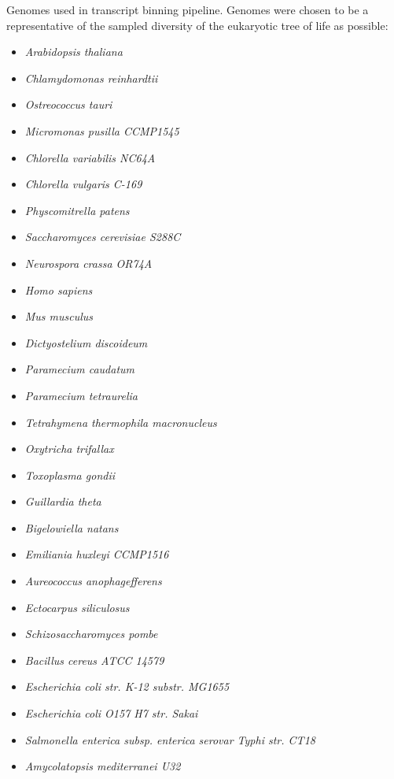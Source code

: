 Genomes used in transcript binning pipeline.
Genomes were chosen to be a representative of the sampled diversity of the 
eukaryotic tree of life as possible:
\begin{itemize}
    \item		\textit{Arabidopsis thaliana} 
    \item		\textit{Chlamydomonas reinhardtii} 
    \item		\textit{Ostreococcus tauri} 
    \item		\textit{Micromonas pusilla CCMP1545}   
    \item		\textit{Chlorella variabilis NC64A} 
    \item		\textit{Chlorella vulgaris C-169} 
    \item		\textit{Physcomitrella patens} 
    \item		\textit{Saccharomyces cerevisiae S288C}  
    \item		\textit{Neurospora crassa OR74A}
    \item		\textit{Homo sapiens}
    \item		\textit{Mus musculus}
    \item		\textit{Dictyostelium discoideum}
    \item		\textit{Paramecium caudatum}
    \item		\textit{Paramecium tetraurelia}
    \item		\textit{Tetrahymena thermophila macronucleus}
    \item		\textit{Oxytricha trifallax}
    \item		\textit{Toxoplasma gondii}
    \item		\textit{Guillardia theta}
    \item		\textit{Bigelowiella natans}
    \item		\textit{Emiliania huxleyi CCMP1516}
    \item		\textit{Aureococcus anophagefferens}
    \item		\textit{Ectocarpus siliculosus}
    \item		\textit{Schizosaccharomyces pombe}
    \item		\textit{Bacillus cereus ATCC 14579}
    \item		\textit{Escherichia coli str. K-12 substr. MG1655}
    \item		\textit{Escherichia coli O157 H7 str. Sakai}
    \item		\textit{Salmonella enterica subsp. enterica serovar Typhi str. CT18}
    \item		\textit{Amycolatopsis mediterranei U32}

\end{itemize}
